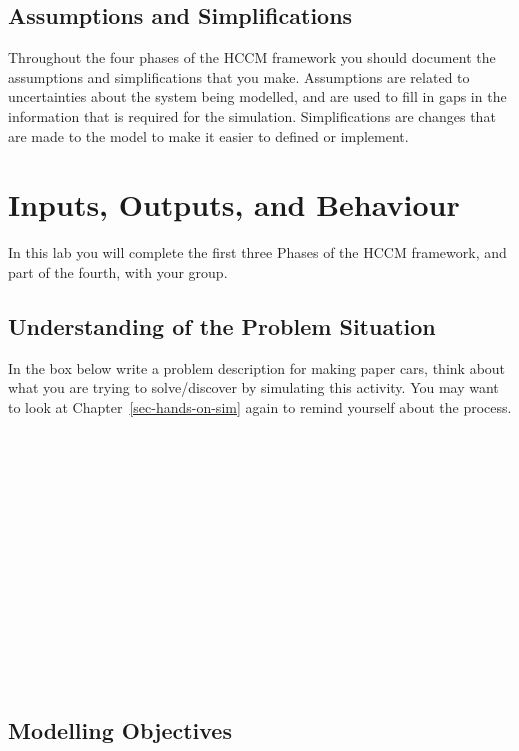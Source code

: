 \documentclass[
  10pt,
  a4paperpaper,
  DIV=11,
  numbers=noendperiod,
  oneside]{scrreprt}
\begin{document}
\section{Assumptions and
Simplifications}\label{assumptions-and-simplifications}

Throughout the four phases of the HCCM framework you should document the
assumptions and simplifications that you make. Assumptions are related
to uncertainties about the system being modelled, and are used to fill
in gaps in the information that is required for the simulation.
Simplifications are changes that are made to the model to make it easier
to defined or implement.

\chapter{Inputs, Outputs, and
Behaviour}\label{inputs-outputs-and-behaviour}

In this lab you will complete the first three Phases of the HCCM
framework, and part of the fourth, with your group.

\section{Understanding of the Problem
Situation}\label{understanding-of-the-problem-situation-1}

In the box below write a problem description for making paper cars,
think about what you are trying to solve/discover by simulating this
activity. You may want to look at Chapter~\ref{sec-hands-on-sim} again
to remind yourself about the process.

\begin{figure}

\begin{mdframed}[innerbottommargin=3cm]

~

~

~

~

~

~

~

~

\end{mdframed}

\end{figure}%

\section{Modelling Objectives}\label{modelling-objectives}
\end{document}
